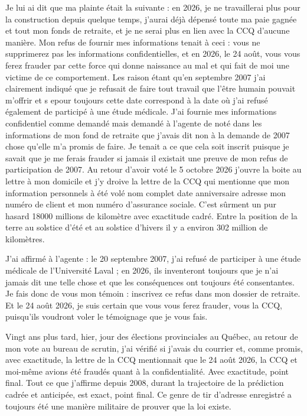 \documentclass[12pt,a4paper]{article}
\begin{document}
Je lui ai dit que ma plainte était la suivante : en 2026, je ne travaillerai
plus pour la construction depuis quelque temps, j'aurai déjà dépensé toute ma
paie gagnée et tout mon fonds de retraite, et je ne serai plus en lien avec
la CCQ d'aucune manière. Mon refus de fournir mes informations tenait à
ceci : vous ne supprimerez pas les informations confidentielles, et en 2026,
le 24 août, vous vous ferez frauder par cette force qui donne naissance au
mal et qui fait de moi une victime de ce comportement. Les raison étant qu'en septembre 2007 
j'ai clairement indiqué que je refusait de faire tout travail que l'être humain pouvait m'offrir et s epour toujours
cette date correspond à la date où j'ai refusé également de participé à une étude médicale. J'ai fournie mes informations 
confidentiel comme demandé mais demandé à l'agente de noté dans les informations de mon fond de retraite que j'avais dit non à la 
demande de 2007 chose qu'elle m'a promis de faire. Je tenait a ce que cela soit inscrit puisque je savait que je me ferais frauder si jamais 
il existait une preuve de mon refus de participation de 2007. Au retour d'avoir voté le 5 octobre 2026 j'ouvre la boite au lettre à mon domicile et j'y droive la 
lettre de la CCQ qui mentionne que mon information personnels à été volé nom complet date anniversaire adresse mon numéro de client et mon numéro d'assurance sociale. C'est sûrment 
un pur hasard 18000 millions de kilomètre avec exactitude cadré. Entre la position de la terre au solstice d'été et au solstice d'hivers il y a environ 302 million de kilomètres.

J'ai affirmé à l'agente : le 20 septembre 2007, j'ai refusé de participer à
une étude médicale de l'Université Laval ; en 2026, ils inventeront toujours
que je n'ai jamais dit une telle chose et que les conséquences ont toujours
été consentantes. Je fais donc de vous mon témoin : inscrivez ce refus dans
mon dossier de retraite. Et le 24 août 2026, je suis certain que vous vous
ferez frauder, vous la CCQ, puisqu'ils voudront voler le témoignage que je
vous fais.

Vingt ans plus tard, hier, jour des élections provinciales au Québec, au
retour de mon vote au bureau de scrutin, j'ai vérifié si j'avais du courrier
et, comme promis, avec exactitude, la lettre de la CCQ mentionnait que le
24 août 2026, la CCQ et moi-même avions été fraudés quant à la
confidentialité. Avec exactitude, point final. Tout ce que j'affirme depuis
2008, durant la trajectoire de la prédiction cadrée et anticipée, est exact,
point final. Ce genre de tir d'adresse enregistré a toujours été une manière
militaire de prouver que la loi existe.
\end{document}
